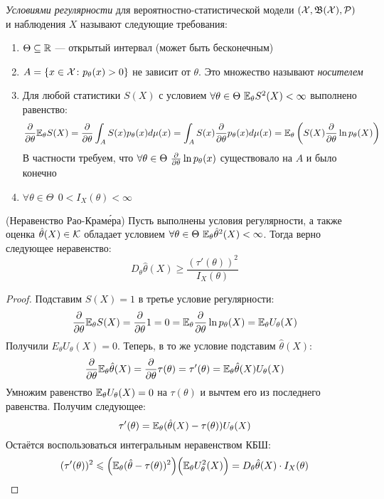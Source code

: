 \begin{definition}
	\textit{Условиями регулярности} для вероятностно-статистической модели $(\mathcal{X}, \mathfrak{B}(\mathcal{X}), \mathcal{P})$ и наблюдения $X$ называют следующие требования:
	\begin{enumerate}
		\item $\Theta \subseteq \mathbb{R}$ --- открытый интервал (может быть бесконечным)
		
		\item $A = \{x \in \mathcal{X} \colon p_\theta(x) > 0\}$ не зависит от $\theta$. Это множество называют \textit{носителем}
		
		\item Для любой статистики $S(X)$ с условием $\forall \theta \in \Theta\ \E_\theta S^2(X) < \infty$ выполнено равенство:
		\[
			\frac{\partial }{\partial \theta} \mathbb{E}_\theta S(X) = \frac{\partial }{\partial \theta} \int_A S(x)p_\theta(x)d\mu(x) = \int_A S(x)\frac{\partial }{\partial \theta} p_\theta(x)d\mu(x) = \mathbb{E}_\theta \left(S(X)\frac{\partial }{\partial \theta}\ln p_\theta(X)\right)
		\]
		В частности требуем, что $\forall \theta \in \Theta\ \frac{\partial }{\partial \theta}\ln p_\theta(x)$ существовало на $A$ и было конечно
		
		\item $\forall \theta \in \Theta\ \ 0 < I_X(\theta) < \infty$
	\end{enumerate}
\end{definition}

\begin{theorem} (Неравенство Рао-Крам\'{е}ра)
	Пусть выполнены условия регулярности, а также оценка $\hat{\theta}(X) \in \mathcal{K}$ обладает условием $\forall \theta \in \Theta\ \E_\theta \hat{\theta}^2(X) < \infty$. Тогда верно следующее неравенство:
	\[
		D_\theta \hat{\theta}(X) \ge \frac{(\tau'(\theta))^2}{I_X(\theta)}
	\]
\end{theorem}

\begin{proof}
	Подставим $S(X) = 1$ в третье условие регулярности:
	\[
		\frac{\partial }{\partial \theta} \mathbb{E}_\theta S(X) = \frac{\partial }{\partial \theta} 1 = 0 = \mathbb{E}_\theta \frac{\partial }{\partial \theta} \ln p_\theta(X) = \mathbb{E}_\theta U_\theta(X)
	\]
	Получили $E_\theta U_\theta(X) = 0$. Теперь, в то же условие подставим $\hat{\theta}(X)$:
	\[
		\frac{\partial }{\partial \theta} \mathbb{E}_\theta \hat{\theta}(X) = \frac{\partial }{\partial \theta} \tau(\theta) = \tau'(\theta) = \mathbb{E}_\theta \hat{\theta}(X)U_\theta(X)
	\]
	Умножим равенство $\mathbb{E}_\theta U_\theta(X) = 0$ на $\tau(\theta)$ и вычтем его из последнего равенства. Получим следующее:
	\[
		\tau'(\theta) = \mathbb{E}_\theta (\hat{\theta}(X) - \tau(\theta))U_\theta(X)
	\]
	Остаётся воспользоваться интегральным неравенством КБШ:
	\[
		(\tau'(\theta))^2 \leqslant \Big(\mathbb{E}_\theta (\hat{\theta} - \tau(\theta))^2\Big)\Big(\mathbb{E}_\theta U_\theta^2(X)\Big) = D_\theta \hat{\theta}(X) \cdot I_X(\theta)
	\]
\end{proof}

